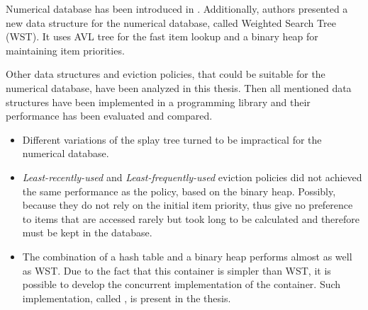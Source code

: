 Numerical database has been introduced in \cite{park90}. Additionally, authors presented a new data structure for the numerical database, called Weighted Search Tree (WST). It uses AVL tree for the fast item lookup and a binary heap for maintaining item priorities.

Other data structures and eviction policies, that could be suitable for the numerical database, have been analyzed in this thesis. Then all mentioned data structures have been implemented in a programming library and their performance has been evaluated and compared.
\begin{itemize}
\item Different variations of the splay tree\cite{splay_tree} turned to be impractical for the numerical database.
\item \emph{Least-recently-used} and \emph{Least-frequently-used} eviction policies did not achieved the same performance as the policy, based on the binary heap. Possibly, because they do not rely on the initial item priority, thus give no preference to items that are accessed rarely but took long to be calculated and therefore must be kept in the database.
\item The combination of a hash table and a binary heap performs almost as well as WST. Due to the fact that this container is simpler than WST, it is possible to develop the concurrent implementation of the container. Such implementation, called \cndcname, is present in the thesis.
\end{itemize}

